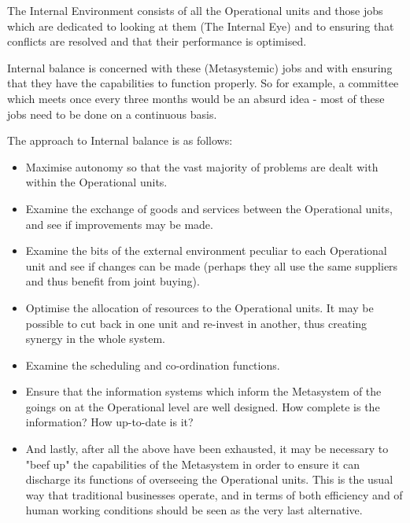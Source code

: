 The Internal Environment consists of all the Operational units and those jobs which are dedicated to looking at them (The Internal Eye) and to ensuring that conflicts are resolved and that their performance is optimised.

Internal balance is concerned with these (Metasystemic) jobs and with ensuring that they have the capabilities to function properly. So for example, a committee which meets once every three months would be an absurd idea - most of these jobs need to be done on a continuous basis.

The approach to Internal balance is as follows:

\begin{itemize}
  \item Maximise autonomy so that the vast majority of problems are dealt with within the Operational units.

  \item Examine the exchange of goods and services between the Operational units, and see if improvements may be made.

  \item Examine the bits of the external environment peculiar to each Operational unit and see if changes can be made (perhaps they all use the same suppliers and thus benefit from joint buying).

  \item Optimise the allocation of resources to the Operational units. It may be possible to cut back in one unit and re-invest in another, thus creating synergy in the whole system.

  \item Examine the scheduling and co-ordination functions.

  \item Ensure that the information systems which inform the Metasystem of the goings on at the Operational level are well designed. How complete is the information? How up-to-date is it?

  \item And lastly, after all the above have been exhausted, it may be necessary to "beef up" the capabilities of the Metasystem in order to ensure it can discharge its functions of overseeing the Operational units. This is the usual way that traditional businesses operate, and in terms of both efficiency and of human working conditions should be seen as the very last alternative.

\end{itemize}

